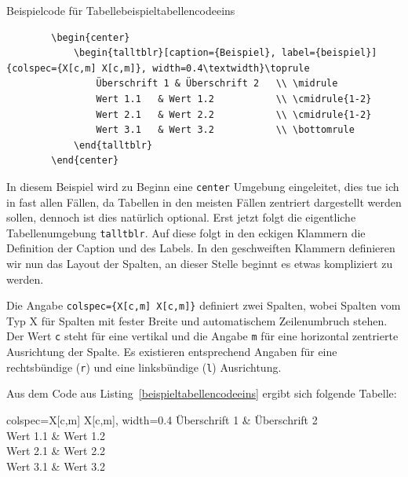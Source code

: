\begin{code}{Beispielcode für Tabelle}{beispieltabellencodeeins}
	\begin{verbatim}
		\begin{center}
			\begin{talltblr}[caption={Beispiel}, label={beispiel}]{colspec={X[c,m] X[c,m]}, width=0.4\textwidth}\toprule
				Überschrift 1 & Überschrift 2	\\ \midrule
				Wert 1.1   & Wert 1.2       	\\ \cmidrule{1-2}
				Wert 2.1   & Wert 2.2       	\\ \cmidrule{1-2}
				Wert 3.1   & Wert 3.2       	\\ \bottomrule
			\end{talltblr}
		\end{center}
	\end{verbatim}
\end{code}
In diesem Beispiel wird zu Beginn eine \texttt{center} Umgebung eingeleitet,
dies tue ich in fast allen Fällen, da Tabellen in den meisten Fällen zentriert
dargestellt werden sollen, dennoch ist dies natürlich optional. Erst jetzt
folgt die eigentliche Tabellenumgebung \texttt{talltblr}. Auf diese folgt in den
eckigen Klammern die Definition der Caption und des Labels. In den geschweiften
Klammern definieren wir nun das Layout der Spalten, an dieser Stelle beginnt es
etwas kompliziert zu werden.

Die Angabe \texttt{colspec=\{X[c,m] X[c,m]\}}
definiert zwei Spalten, wobei Spalten vom Typ X für Spalten mit fester Breite
und automatischem Zeilenumbruch stehen. Der Wert \texttt{c} steht für eine
vertikal und die Angabe \texttt{m} für eine horizontal zentrierte Ausrichtung
der Spalte. Es existieren entsprechend Angaben für eine rechtsbündige
(\texttt{r}) und eine linksbündige (\texttt{l}) Ausrichtung.

Aus dem Code aus Listing~\ref{beispieltabellencodeeins} ergibt sich folgende Tabelle:

\begin{center}
	\begin{talltblr}[caption={Tabelle mit zwei Spalten}, label={beispieleins}]{colspec={X[c,m] X[c,m]}, width=0.4\textwidth}\toprule
		Überschrift 1 & Überschrift 2 \\ \midrule
		Wert 1.1      & Wert 1.2      \\ 
		Wert 2.1      & Wert 2.2      \\ 
		Wert 3.1      & Wert 3.2      \\ \bottomrule
	\end{talltblr}
\end{center}

